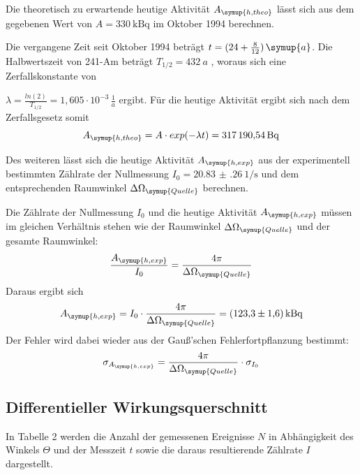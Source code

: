 Die theoretisch zu erwartende heutige Aktivität $A_{\symup{h,theo}}$ lässt sich aus dem gegebenen Wert von
$A = \SI{330}{\kilo\becquerel}$ \cite{sample1} im Oktober 1994 berechnen.

Die vergangene Zeit seit Oktober 1994 beträgt $t= (24 + \frac{8}{12})\,\symup{a}$.
Die Halbwertszeit von 241-Am beträgt $T_{1/2} = \SI{432}{a}$ \cite{sample8}, woraus sich eine
Zerfallskonstante von

$\lambda = \frac{ln(2)}{T_{1/2}} = 1,605 \cdot 10^{-3} \, \frac{1}{a}$ ergibt.
Für die heutige Aktivität ergibt sich nach dem Zerfallsgesetz somit
\begin{equation*}
  A_{\symup{h,theo}} = A \cdot exp(-\lambda t) = \SI{317190.54}{\becquerel}
\end{equation*}

Des weiteren lässt sich die heutige Aktivität $A_{\symup{h,exp}}$ aus der experimentell bestimmten
Zählrate der Nullmessung $I_0 = \SI{20.83(26)}{1\per\second}$ und dem entsprechenden Raumwinkel $\Delta \Omega_{\symup{Quelle}}$ berechnen.

Die Zählrate der Nullmessung $I_0$ und die heutige Aktivität $A_\symup{h,exp}$ müssen im gleichen
Verhältnis stehen wie der Raumwinkel $\Delta \Omega_{\symup{Quelle}}$ und der gesamte Raumwinkel:
\begin{equation*}
  \frac{A_\symup{h,exp}}{I_0} = \frac{4\pi}{\Delta \Omega_{\symup{Quelle}}}
\end{equation*}
Daraus ergibt sich
\begin{equation*}
  A_\symup{h,exp} = I_0 \cdot \frac{4\pi}{\Delta \Omega_{\symup{Quelle}}} = \SI{123.3(16)}{\kilo\becquerel}
\end{equation*}
Der Fehler wird dabei wieder aus der Gauß'schen Fehlerfortpflanzung bestimmt:
\begin{equation*}
  \sigma_{A_\symup{h,exp}} = \frac{4\pi}{\Delta \Omega_{\symup{Quelle}}} \cdot \sigma_{I_0}
\end{equation*}



\subsection{Differentieller Wirkungsquerschnitt}
\label{sec:wq}
In Tabelle 2 werden die Anzahl der gemessenen Ereignisse $N$ in Abhängigkeit des Winkels $\Theta$ und der Messzeit $t$
sowie die daraus resultierende Zählrate $I$ dargestellt.


